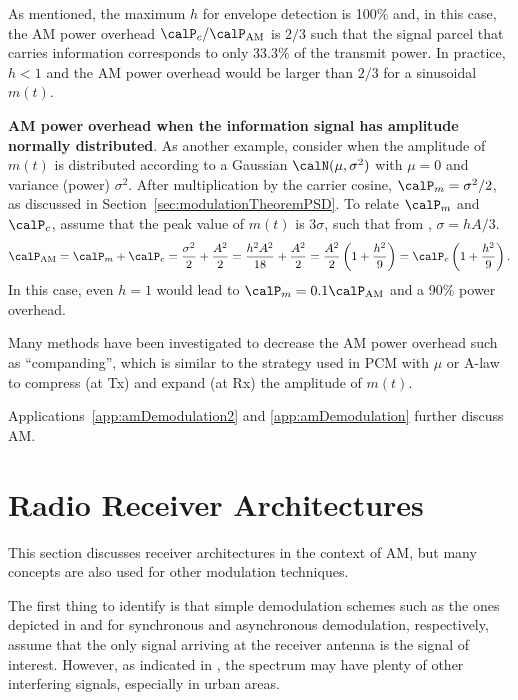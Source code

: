 As mentioned, the maximum $h$ for envelope detection is 100\% and, in this case, the AM power overhead $\calP_c / \calP_{\textrm{AM}}$ is $2/3$ such that the signal parcel that carries information corresponds to only 33.3\% of the transmit power. In practice, $h<1$ and the AM power overhead would be larger than $2/3$ for a sinusoidal $m(t)$.
\eExample

\bExample \textbf{AM power overhead when the information signal has amplitude normally distributed}.
As another example, consider when the amplitude of $m(t)$ is distributed according to a Gaussian $\calN(\mu,\sigma^2)$ with $\mu=0$ and variance (power) $\sigma^2$. After multiplication by the carrier cosine, $\calP_m = \sigma^2/2$, as discussed in Section~\ref{sec:modulationTheoremPSD}. To relate $\calP_m$ and $\calP_c$, assume that the peak value of $m(t)$ is $3 \sigma$, such that 
from , $\sigma = h A / 3$.
\begin{equation}
\calP_{\textrm{AM}} = \calP_m + \calP_c = \frac{\sigma^2}{2} + \frac{A^2}{2} = \frac{h^2 A^2}{18} + \frac{A^2}{2} = \frac{A^2}{2} \left(1 + \frac{h^2}{9} \right) = \calP_c \left(1 + \frac{h^2}{9} \right).
\label{eq:amPower2}
\end{equation}
In this case, even $h=1$ would lead to $\calP_m = 0.1 \calP_{\textrm{AM}}$ and a 90\% power overhead.
\eExample

Many methods have been investigated to decrease the AM power overhead such as ``companding'', which is similar to the strategy used in PCM with $\mu$ or A-law to compress (at Tx) and expand (at Rx) the amplitude of $m(t)$.

Applications~\ref{app:amDemodulation2} and \ref{app:amDemodulation} further discuss AM.

\section{Radio Receiver Architectures}
\label{sec:radioReceiverArchitectures}

This section discusses receiver architectures in the context of AM, but many concepts are also used for other modulation techniques.

The first thing to identify is that simple demodulation schemes such as the ones depicted in  and  for synchronous and asynchronous demodulation, respectively, assume that the only signal arriving at the receiver antenna is the signal of interest. However, as indicated in , the spectrum may have plenty of other interfering signals, especially in urban areas.

